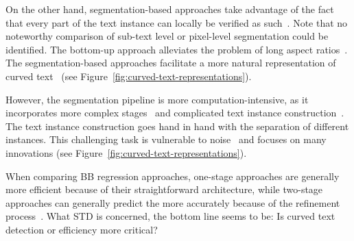 On the other hand, segmentation-based approaches take advantage of the fact that every part of the
text instance can locally be verified as such~\citep{long_scene_2021}.
Note that no noteworthy comparison of sub-text level or pixel-level segmentation could be identified.
The bottom-up approach alleviates the problem of long aspect ratios~\citep{shi_detecting_2017}.
The segmentation-based approaches facilitate a more natural representation of curved
text~\citep{dai_fused_2018,long_scene_2021} (see Figure~\ref{fig:curved-text-representations}).

However, the segmentation pipeline is more computation-intensive, as it incorporates more complex
stages~\citep{dai_fused_2018} and complicated text instance
construction~\citep{xie_aggregation_2019,liao_real-time_2019,dai_fused_2018}.
The text instance construction goes hand in hand with the separation of different instances.
This challenging task is vulnerable to noise~\citep{long_scene_2021} and focuses on
many innovations (see Figure~\ref{fig:curved-text-representations}).

When comparing \ac{BB} regression approaches, one-stage approaches are generally more
efficient  because of their straightforward architecture, while two-stage approaches can generally
predict the more accurately  because of the refinement process~\citep{lu_mimicdet_2020}.
What \ac{STD} is concerned, the bottom line seems to be:
Is curved text detection or efficiency more critical?

